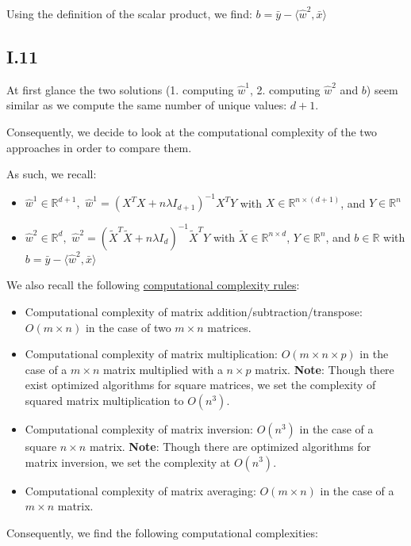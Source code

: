 \documentclass{homework}
\begin{document}
\textcolor{OliveGreen}{Using the definition of the scalar product, we find: $b=\bar{y}-\langle\hat{w}^2,\bar{x}\rangle$}

\subsection*{I.11}

At first glance the two solutions (1. computing $\hat{w}^1$, 2. computing $\hat{w}^2$ and $b$) seem similar as we compute the same number of unique values: $d+1$.

Consequently, we decide to look at the computational complexity of the two approaches in order to compare them. 

As such, we recall:
\begin{itemize}
    \item $\hat{w}^1\in\mathbb{R}^{d+1},\,\,\hat{w}^1=(X^TX+n\lambda I_{d+1})^{-1}X^TY$ with $X\in\mathbb{R}^{n\times(d+1)}$, and $Y\in\mathbb{R}^n$
    \item $\hat{w}^2\in\mathbb{R}^d,\,\,\hat{w}^2=(\tilde{X}^T\tilde{X}+n\lambda I_d)^{-1}\tilde{X}^TY$ with $\tilde{X}\in\mathbb{R}^{n\times d}$, $Y\in\mathbb{R}^n$, and $b\in\mathbb{R}$ with $b=\bar{y}-\langle\hat{w}^2,\bar{x}\rangle$
\end{itemize}
We also recall the following \href{https://en.wikipedia.org/wiki/Computational_complexity_of_mathematical_operations}{computational complexity rules}:
\begin{itemize}
    \item Computational complexity of matrix addition/subtraction/transpose: $O(m\times n)$ in the case of two $m\times n$ matrices.
    \item Computational complexity of matrix multiplication: $O(m\times n\times p)$ in the case of a $m\times n$ matrix multiplied with a $n\times p$ matrix. \textbf{Note}: Though there exist optimized algorithms for square matrices, we set the complexity of squared matrix multiplication to $O(n^3)$.
    \item Computational complexity of matrix inversion: $O(n^3)$ in the case of a square $n\times n$ matrix. \textbf{Note}: Though there are optimized algorithms for matrix inversion, we set the complexity at $O(n^3)$.
    \item Computational complexity of matrix averaging: $O(m\times n)$ in the case of a $m\times n$ matrix.
\end{itemize}

Consequently, we find the following computational complexities:
\end{document}
